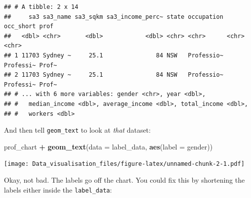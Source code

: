 \documentclass[]{book}
\newenvironment{Shaded}{\begin{snugshade}}{\end{snugshade}}
\newcommand{\DataTypeTok}[1]{\textcolor[rgb]{0.13,0.29,0.53}{#1}}
\newcommand{\KeywordTok}[1]{\textcolor[rgb]{0.13,0.29,0.53}{\textbf{#1}}}
\newcommand{\NormalTok}[1]{#1}
\newcommand{\OperatorTok}[1]{\textcolor[rgb]{0.81,0.36,0.00}{\textbf{#1}}}
\newcommand{\StringTok}[1]{\textcolor[rgb]{0.31,0.60,0.02}{#1}}
\begin{document}
\begin{Shaded}
\end{Shaded}

\begin{verbatim}
## # A tibble: 2 x 14
##     sa3 sa3_name sa3_sqkm sa3_income_perc~ state occupation occ_short prof 
##   <dbl> <chr>       <dbl>            <dbl> <chr> <chr>      <chr>     <chr>
## 1 11703 Sydney ~     25.1               84 NSW   Professio~ Professi~ Prof~
## 2 11703 Sydney ~     25.1               84 NSW   Professio~ Professi~ Prof~
## # ... with 6 more variables: gender <chr>, year <dbl>,
## #   median_income <dbl>, average_income <dbl>, total_income <dbl>,
## #   workers <dbl>
\end{verbatim}

And then tell \texttt{geom\_text} to look at \emph{that} dataset:

\begin{Shaded}
\begin{Highlighting}[]
\NormalTok{prof_chart }\OperatorTok{+}
\StringTok{  }\KeywordTok{geom_text}\NormalTok{(}\DataTypeTok{data =}\NormalTok{ label_data,}
            \KeywordTok{aes}\NormalTok{(}\DataTypeTok{label =}\NormalTok{ gender))}
\end{Highlighting}
\end{Shaded}

\texttt{[image: Data\_visualisation\_files/figure-latex/unnamed-chunk-2-1.pdf]}

Okay, not bad. The labels go off the chart. You could fix this by shortening the labels either inside the \texttt{label\_data}:

\begin{Shaded}
\end{Shaded}
\end{document}
